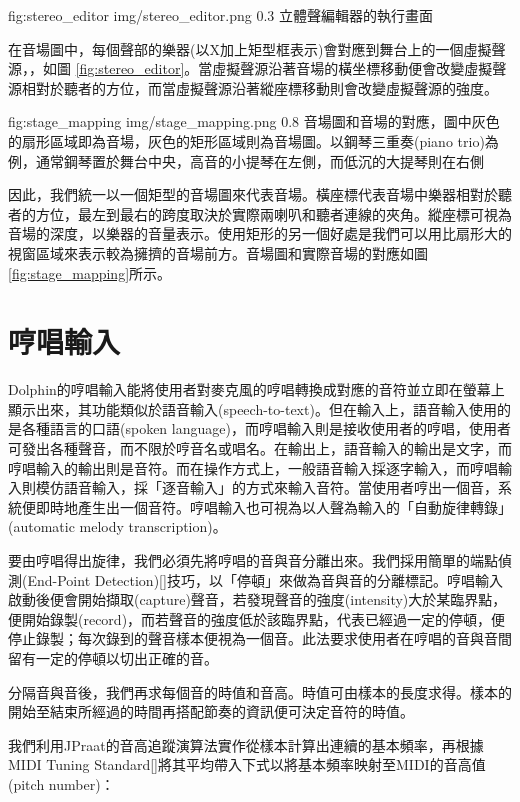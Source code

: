 \documentclass[12pt,a4paper,oneside]{report}
\begin{document}
\figurewithcaption
{fig:stereo_editor}
{img/stereo_editor.png}
{0.3}
{立體聲編輯器的執行畫面}

在音場圖中，每個聲部的樂器(以X加上矩型框表示)會對應到舞台上的一個虛擬聲源，，如圖 \ref{fig:stereo_editor}。當虛擬聲源沿著音場的橫坐標移動便會改變虛擬聲源相對於聽者的方位，而當虛擬聲源沿著縱座標移動則會改變虛擬聲源的強度。

\figurewithcaption
{fig:stage_mapping}
{img/stage_mapping.png}
{0.8}
{音場圖和音場的對應，圖中灰色的扇形區域即為音場，灰色的矩形區域則為音場圖。以鋼琴三重奏(piano trio)為例，通常鋼琴置於舞台中央，高音的小提琴在左側，而低沉的大提琴則在右側}

因此，我們統一以一個矩型的音場圖來代表音場。橫座標代表音場中樂器相對於聽者的方位，最左到最右的跨度取決於實際兩喇叭和聽者連線的夾角。縱座標可視為音場的深度，以樂器的音量表示。使用矩形的另一個好處是我們可以用比扇形大的視窗區域來表示較為擁擠的音場前方。音場圖和實際音場的對應如圖 \ref{fig:stage_mapping}所示。
\chapter{哼唱輸入} %

Dolphin的哼唱輸入能將使用者對麥克風的哼唱轉換成對應的音符並立即在螢幕上顯示出來，其功能類似於語音輸入(speech-to-text)。但在輸入上，語音輸入使用的是各種語言的口語(spoken language)，而哼唱輸入則是接收使用者的哼唱，使用者可發出各種聲音，而不限於哼音名或唱名。在輸出上，語音輸入的輸出是文字，而哼唱輸入的輸出則是音符。而在操作方式上，一般語音輸入採逐字輸入，而哼唱輸入則模仿語音輸入，採「逐音輸入」的方式來輸入音符。當使用者哼出一個音，系統便即時地產生出一個音符。哼唱輸入也可視為以人聲為輸入的「自動旋律轉錄」(automatic melody transcription)。

要由哼唱得出旋律，我們必須先將哼唱的音與音分離出來。我們採用簡單的端點偵測(End-Point Detection)[]技巧，以「停頓」來做為音與音的分離標記。哼唱輸入啟動後便會開始擷取(capture)聲音，若發現聲音的強度(intensity)大於某臨界點，便開始錄製(record)，而若聲音的強度低於該臨界點，代表已經過一定的停頓，便停止錄製；每次錄到的聲音樣本便視為一個音。此法要求使用者在哼唱的音與音間留有一定的停頓以切出正確的音。

分隔音與音後，我們再求每個音的時值和音高。時值可由樣本的長度求得。樣本的開始至結束所經過的時間再搭配節奏的資訊便可決定音符的時值。

我們利用JPraat的音高追蹤演算法實作從樣本計算出連續的基本頻率，再根據MIDI Tuning Standard[]將其平均帶入下式以將基本頻率映射至MIDI的音高值(pitch number)：
\end{document}
